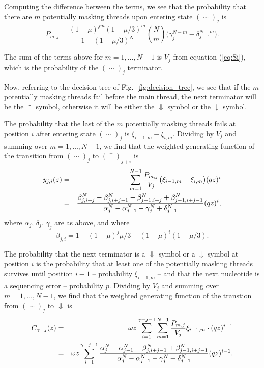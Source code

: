 \documentclass{article}
\begin{document}
Computing the difference between the terms, we see that the probability
that there are $m$ potentially masking threads upon entering state
$(\sim)_j$ is
\begin{equation*}
P_{m,j} = \frac{(1-\mu)^{jm} (1-\mu/3)^m}{1-(1-\mu/3)^N} {N \choose m} 
\big( \gamma_j^{N-m} - \delta_{j-1}^{N-m} \big).
\end{equation*}


The sum of the terms above for $m = 1, \ldots, N-1$ is $V_j$ from equation
(\ref{eq:Si}), which is the probability of the $(\sim)_j$ terminator.

Now, referring to the decision tree of Fig.~\ref{fig:decision_tree}, we
see that if the $m$ potentially masking threads fail before the main
thread, the next terminator will be the $\uparrow$ symbol, otherwise it
will be either the $\Downarrow$ symbol or the $\downarrow$ symbol.

The probability that the last of the $m$ potentially masking threads fails
at position $i$ after entering state $(\sim)_j$ is
$\xi_{i-1,m}-\xi_{i,m}$. Dividing by $V_j$ and summing over $m = 1,
\ldots, N-1$, we find that the weighted generating function of the
transition from $(\sim)_j$ to $(\uparrow)_{j+i}$ is
\begin{eqnarray}
y_{j,i}(z) &=& \sum_{m=1}^{N-1} \frac{P_{m,j}}{V_j}
\big( \xi_{i-1,m}-\xi_{i,m} \big) (qz)^i \notag \\
&=& \frac{\beta_{j,i+j}^N - \beta_{j,i+j-1}^N
-\beta_{j-1,i+j}^N + \beta_{j-1,i+j-1}^N}
  {\alpha_j^N-\alpha_{j-1}^N-\gamma_j^N+\delta_{j-1}^N} (qz)^i,
\end{eqnarray}
where $\alpha_j$, $\delta_j$, $\gamma_j$ are as above, and where
\begin{equation}
\beta_{j,i} = 1 - (1-\mu)^j\mu/3 - (1-\mu)^i(1-\mu/3).
\end{equation}

The probability that the next terminator is a $\Downarrow$ symbol or a
$\downarrow$ symbol at position $i$ is the probability that at least one
of the potentially masking threads survives until position $i-1$ --
probability $\xi_{i-1,m}$ -- and that the next nucleotide is a sequencing
error -- probability $p$. Dividing by $V_j$ and summing over $m = 1,
\ldots, N-1$, we find that the weighted generating function of the
transtion from $(\sim)_j$ to
$\Downarrow$ is
\begin{eqnarray}
C_{\gamma-j}(z) &=& \omega z \sum_{i=1}^{\gamma-j-1} \sum_{m=1}^{N-1}
  \frac{P_{m,j}}{V_j} \xi_{i-1,m} \cdot (qz)^{i-1} \notag \\
  &=& \omega z \sum_{i=1}^{\gamma-j-1}
\frac{ \alpha_j^N-\alpha_{j-1}^N-\beta_{j,i+j-1}^N
  +\beta_{j-1,i+j-1}^N }
{\alpha_j^N-\alpha_{j-1}^N-\gamma_j^N+\delta_{j-1}^N} (qz)^{i-1}.
\end{eqnarray}
\end{document}
